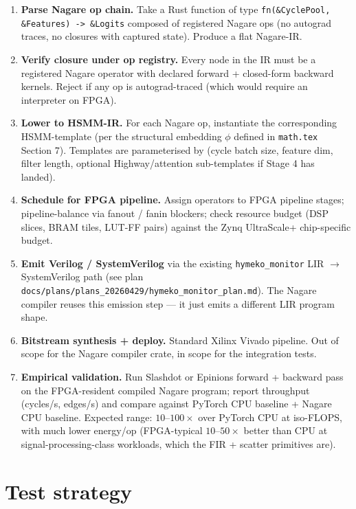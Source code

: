 \documentclass[11pt]{article}
\begin{document}
\begin{enumerate}
  \item \textbf{Parse Nagare op chain.} Take a Rust function of
    type \texttt{fn(\&CyclePool, \&Features) -> \&Logits} composed
    of registered Nagare ops (no autograd traces, no closures with
    captured state). Produce a flat Nagare-IR.
  \item \textbf{Verify closure under op registry.} Every node in
    the IR must be a registered Nagare operator with declared
    forward + closed-form backward kernels. Reject if any op is
    autograd-traced (which would require an interpreter on FPGA).
  \item \textbf{Lower to HSMM-IR.} For each Nagare op, instantiate
    the corresponding HSMM-template (per the structural embedding
    $\phi$ defined in \texttt{math.tex} Section 7). Templates are
    parameterised by (cycle batch size, feature dim, filter length,
    optional Highway/attention sub-templates if Stage 4 has landed).
  \item \textbf{Schedule for FPGA pipeline.} Assign operators to
    FPGA pipeline stages; pipeline-balance via fanout / fanin
    blockers; check resource budget (DSP slices, BRAM tiles,
    LUT-FF pairs) against the Zynq UltraScale+ chip-specific
    budget.
  \item \textbf{Emit Verilog / SystemVerilog} via the existing
    \texttt{hymeko\_monitor} LIR $\to$ SystemVerilog path (see
    plan \texttt{docs/plans/plans\_20260429/hymeko\_monitor\_plan.md}).
    The Nagare compiler reuses this emission step --- it just
    emits a different LIR program shape.
  \item \textbf{Bitstream synthesis + deploy.} Standard Xilinx
    Vivado pipeline. Out of scope for the Nagare compiler crate,
    in scope for the integration tests.
  \item \textbf{Empirical validation.} Run Slashdot or Epinions
    forward + backward pass on the FPGA-resident compiled Nagare
    program; report throughput (cycles/s, edges/s) and compare
    against PyTorch CPU baseline + Nagare CPU baseline. Expected
    range: $10$--$100\times$ over PyTorch CPU at iso-FLOPS, with
    much lower energy/op (FPGA-typical $10$--$50\times$ better
    than CPU at signal-processing-class workloads, which the
    FIR + scatter primitives are).
\end{enumerate}

\section{Test strategy}
\end{document}
